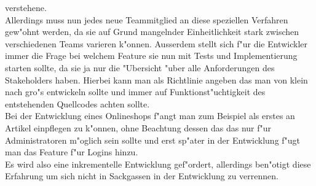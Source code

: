     verstehene.\\
    Allerdings muss nun jedes neue Teammitglied an diese speziellen Verfahren
    gew"ohnt werden, da sie auf Grund mangelnder Einheitlichkeit stark zwischen
    verschiedenen Teams varieren k"onnen.
    Ausserdem stellt sich f"ur die Entwickler immer die Frage bei welchem Feature
    sie nun mit Tests und Implementierung starten sollte, da sie ja nur die 
    "Ubersicht "uber alle Anforderungen des Stakeholders haben. Hierbei kann man
    als Richtlinie angeben das man von klein nach gro"s entwickeln sollte und 
    immer auf Funktionst"uchtigkeit des entstehenden Quellcodes achten sollte.\\
    Bei der Entwicklung eines Onlineshops f"angt man zum Beispiel als erstes 
    an Artikel einpflegen zu k"onnen, ohne Beachtung dessen das das nur f"ur
    Administratoren m"oglich sein sollte und erst sp"ater in der Entwicklung
    f"ugt man das Feature f"ur Logins hinzu.\\
    Es wird also eine inkrementelle Entwicklung gef"ordert, allerdings ben"otigt
    diese Erfahrung um sich nicht in Sackgassen in der Entwicklung zu verrennen.\\